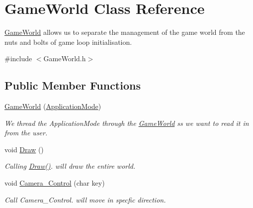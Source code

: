 \hypertarget{classGameWorld}{}\section{Game\+World Class Reference}
\label{classGameWorld}


\hyperlink{classGameWorld}{Game\+World} allows us to separate the management of the game world from the nuts and bolts of game loop initialisation.  




{\ttfamily \#include $<$Game\+World.\+h$>$}

\subsection*{Public Member Functions}
\begin{DoxyCompactItemize}
\item 
\hyperlink{classGameWorld_a17a84e57a80600961088afc753036f89}{Game\+World} (\hyperlink{common_8h_add86e7c88dd109abea3f708b422f31f0}{Application\+Mode})
\begin{DoxyCompactList}\small\item\em We thread the Application\+Mode through the \hyperlink{classGameWorld}{Game\+World} ss we want to read it in from the user. \end{DoxyCompactList}\item 
void \hyperlink{classGameWorld_a275418607d8286979b276f165ad5876b}{Draw} ()
\begin{DoxyCompactList}\small\item\em Calling \hyperlink{classGameWorld_a275418607d8286979b276f165ad5876b}{Draw()}. will draw the entire world. \end{DoxyCompactList}\item 
void \hyperlink{classGameWorld_a43080b1c693798b12f7faf28a6b45ab5}{Camera\+\_\+\+Control} (char key)
\begin{DoxyCompactList}\small\item\em Call Camera\+\_\+\+Control. will move in specfic direction. \end{DoxyCompactList}\end{DoxyCompactItemize}
